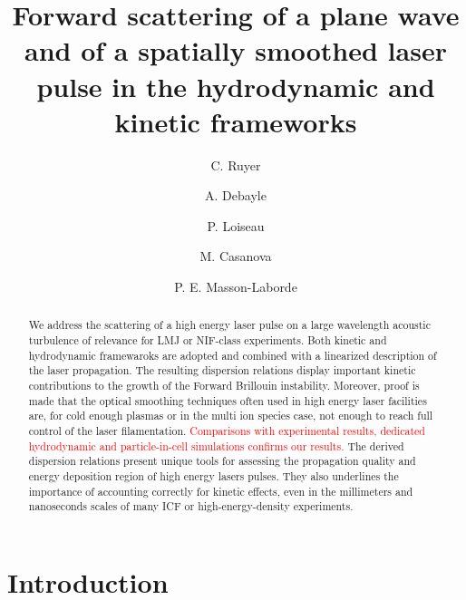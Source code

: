 \documentclass[
 reprint,
 amsmath,amssymb,
 aps,
]{revtex4-1}
\begin{document}
\title{ 
Forward scattering of a plane wave and of a spatially smoothed laser pulse  in the hydrodynamic and kinetic frameworks }
\author{C. Ruyer}
\author{A. Debayle}
\author{P. Loiseau}
\author{M. Casanova}
\author{P. E. Masson-Laborde}

\begin{abstract}
We address the scattering of a high energy laser pulse on a   large wavelength acoustic turbulence of relevance for LMJ or NIF-class  experiments. 
Both kinetic and hydrodynamic framewaroks are adopted and combined with a linearized  description of the laser propagation. The resulting dispersion relations display important kinetic  contributions to the growth of the Forward Brillouin instability.  
Moreover, proof is made that the optical smoothing techniques  often used in high energy laser facilities are, for cold enough plasmas or in the multi ion species case, not enough to reach full control of the laser filamentation.
\textcolor{red}{Comparisons with experimental results, dedicated hydrodynamic and particle-in-cell simulations confirms our results. }
The   derived dispersion relations  present unique tools for assessing the propagation quality and energy deposition region of high energy lasers pulses. They also underlines the importance of accounting correctly for kinetic effects, even in the millimeters and nanoseconds scales of many  ICF or high-energy-density experiments. 
\end{abstract}

\maketitle

\section{Introduction}
\end{document}
